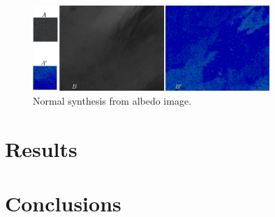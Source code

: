 \documentclass[11pt]{article}
\begin{document}
\begin{figure}[htbp!]
\centering
\includegraphics[width=0.8\textwidth]{img/normal_generation}
	\caption{ Normal synthesis from albedo image.}
	\label{fig:normal_synthesis}
\end{figure}



\section{Results}


\section{Conclusions}



\end{document}
